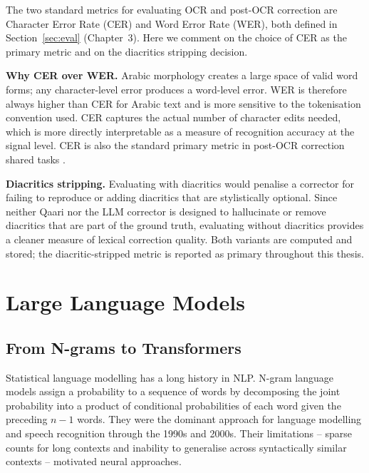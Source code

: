 The two standard metrics for evaluating OCR and post-OCR correction are Character
Error Rate (CER) and Word Error Rate (WER), both defined in
Section~\ref{sec:eval} (Chapter~3).
Here we comment on the choice of CER as the primary metric and on the
diacritics stripping decision.

\textbf{Why CER over WER.}
Arabic morphology creates a large space of valid word forms; any character-level
error produces a word-level error.
WER is therefore always higher than CER for Arabic text and is more sensitive to
the tokenisation convention used.
CER captures the actual number of character edits needed, which is more directly
interpretable as a measure of recognition accuracy at the signal level.
CER is also the standard primary metric in post-OCR correction shared tasks
\cite{rigaud2019icdar}.

\textbf{Diacritics stripping.}
Evaluating with diacritics would penalise a corrector for failing to reproduce or
adding diacritics that are stylistically optional.
Since neither Qaari nor the LLM corrector is designed to hallucinate or remove
diacritics that are part of the ground truth, evaluating without diacritics
provides a cleaner measure of lexical correction quality.
Both variants are computed and stored; the diacritic-stripped metric is reported
as primary throughout this thesis.

\section{Large Language Models}
\label{sec:llms}

\subsection{From N-grams to Transformers}
\label{subsec:lm_history}

Statistical language modelling has a long history in NLP.
N-gram language models assign a probability to a sequence of words by decomposing
the joint probability into a product of conditional probabilities of each word
given the preceding $n-1$ words.
They were the dominant approach for language modelling and speech recognition
through the 1990s and 2000s.
Their limitations -- sparse counts for long contexts and inability to generalise
across syntactically similar contexts -- motivated neural approaches.


